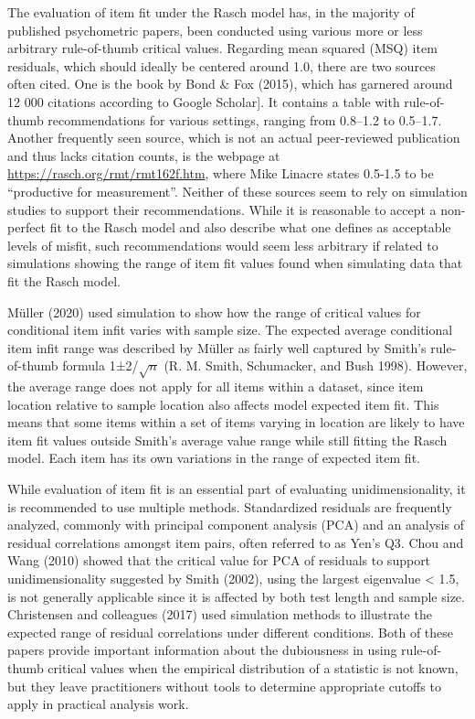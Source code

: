 \documentclass[
  letterpaper,
  DIV=11,
  numbers=noendperiod]{scrartcl}
\begin{document}
The evaluation of item fit under the Rasch model has, in the majority of
published psychometric papers, been conducted using various more or less
arbitrary rule-of-thumb critical values. Regarding mean squared (MSQ)
item residuals, which should ideally be centered around 1.0, there are
two sources often cited. One is the book by Bond \& Fox (2015), which
has garnered around 12 000 citations according to Google Scholar{]}. It
contains a table with rule-of-thumb recommendations for various
settings, ranging from 0.8--1.2 to 0.5--1.7. Another frequently seen
source, which is not an actual peer-reviewed publication and thus lacks
citation counts, is the webpage at
\url{https://rasch.org/rmt/rmt162f.htm}, where Mike Linacre states
0.5-1.5 to be ``productive for measurement''. Neither of these sources
seem to rely on simulation studies to support their recommendations.
While it is reasonable to accept a non-perfect fit to the Rasch model
and also describe what one defines as acceptable levels of misfit, such
recommendations would seem less arbitrary if related to simulations
showing the range of item fit values found when simulating data that fit
the Rasch model.

Müller (2020) used simulation to show how the range of critical values
for conditional item infit varies with sample size. The expected average
conditional item infit range was described by Müller as fairly well
captured by Smith's rule-of-thumb formula 1±2/\(\sqrt{n}\) (R. M. Smith,
Schumacker, and Bush 1998). However, the average range does not apply
for all items within a dataset, since item location relative to sample
location also affects model expected item fit. This means that some
items within a set of items varying in location are likely to have item
fit values outside Smith's average value range while still fitting the
Rasch model. Each item has its own variations in the range of expected
item fit.

While evaluation of item fit is an essential part of evaluating
unidimensionality, it is recommended to use multiple methods.
Standardized residuals are frequently analyzed, commonly with principal
component analysis (PCA) and an analysis of residual correlations
amongst item pairs, often referred to as Yen's Q3. Chou and Wang (2010)
showed that the critical value for PCA of residuals to support
unidimensionality suggested by Smith (2002), using the largest
eigenvalue \textless{} 1.5, is not generally applicable since it is
affected by both test length and sample size. Christensen and colleagues
(2017) used simulation methods to illustrate the expected range of
residual correlations under different conditions. Both of these papers
provide important information about the dubiousness in using
rule-of-thumb critical values when the empirical distribution of a
statistic is not known, but they leave practitioners without tools to
determine appropriate cutoffs to apply in practical analysis work.
\end{document}

